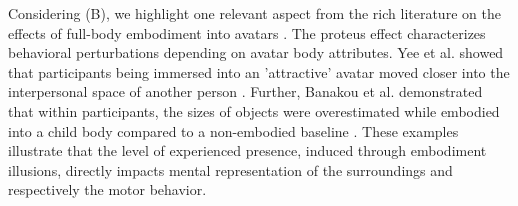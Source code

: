 Considering (B), we highlight one relevant aspect from the rich literature on the effects of full-body embodiment into avatars \cite{Maister2015}. The proteus effect characterizes behavioral perturbations depending on avatar body attributes. Yee et al. showed that participants being immersed into an 'attractive' avatar moved closer into the interpersonal space of another person \cite{Yee2007}. Further, Banakou et al. demonstrated that within participants, the sizes of objects were overestimated while embodied into a child body compared to a non-embodied baseline \cite{Banakou2013}.
These examples illustrate that the level of experienced presence, induced through embodiment illusions, directly impacts mental representation of the surroundings and respectively the motor behavior.